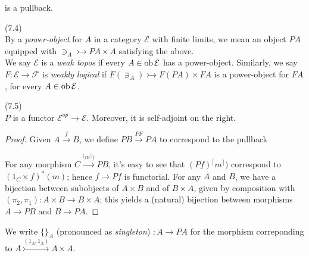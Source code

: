 \documentclass[a4paper]{article}
\begin{document}

is a pullback.

\begin{defi} (7.4)\\
    By a \emph{power-object} for $A$ in a category $\mathcal{E}$ with finite limits, we mean an object $PA$ equipped with $\ni_A \rightarrowtail PA \times A$ satisfying the above.\\
    We say $\mathcal{E}$ is a \emph{weak topos} if every $A \in \operatorname{ob}\mathcal{E}$ has a power-object. Similarly, we say $F:\mathcal{E} \to \mathcal{F}$ is \emph{weakly logical} if $F(\ni_A) \rightarrowtail F(PA) \times FA$ is a power-object for $FA$, for every $A \in \operatorname{ob}\mathcal{E}$.
\end{defi}

\begin{lemma} (7.5)\\
    $P$ is a functor $\mathcal{E}^{op} \to \mathcal{E}$. Moreover, it is self-adjoint on the right.
    \begin{proof}
        Given $A \xrightarrow{f} B$, we define $PB \xrightarrow{PF} PA$ to correspond to the pullback


        For any morphism $C \xrightarrow{{}^{\lceil}m^\rceil)} PB$, it's easy to see that $(Pf){}^{\lceil}m^\rceil)$ correspond to $(1_C \times f)^*(m)$; hence $f \to Pf$ is functorial. For any $A$ and $B$, we have a bijection between subobjects of $A \times B$ and of $B \times A$, given by composition with $(\pi_2,\pi_1): A \times B \to B \times A$; this yields a (natural) bijection between morphisms $A \to PB$ and $B \to PA$.
    \end{proof}
\end{lemma}

We write $\{\}_A$ (pronounced as \emph{singleton}) $:A \to PA$ for the morphism correponding to $A \stackrel{(1_A,1_A)}{\rightarrowtail} A \times A$.
\end{document}
